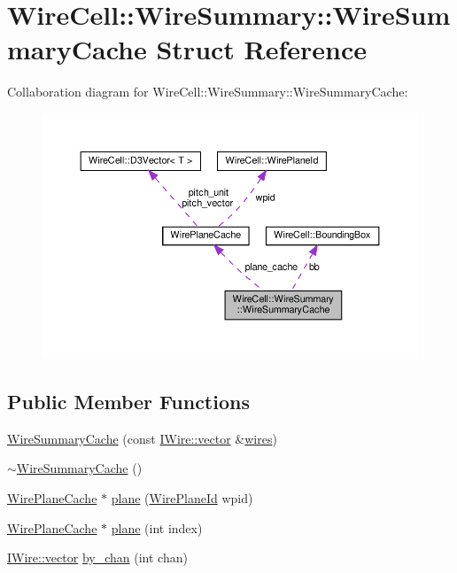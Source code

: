 \hypertarget{struct_wire_summary_1_1_wire_summary_cache}{}\section{Wire\+Cell\+:\+:Wire\+Summary\+:\+:Wire\+Summary\+Cache Struct Reference}
\label{struct_wire_summary_1_1_wire_summary_cache}


Collaboration diagram for Wire\+Cell\+:\+:Wire\+Summary\+:\+:Wire\+Summary\+Cache\+:
\nopagebreak
\begin{figure}[H]
\begin{center}
\leavevmode
\includegraphics[width=350pt]{struct_wire_summary_1_1_wire_summary_cache__coll__graph}
\end{center}
\end{figure}
\subsection*{Public Member Functions}
\begin{DoxyCompactItemize}
\item 
\hyperlink{struct_wire_summary_1_1_wire_summary_cache_abab786675698a6a4add71eabf8f04b49}{Wire\+Summary\+Cache} (const \hyperlink{class_wire_cell_1_1_i_data_ae1a9f863380499bb43f39fabb6276660}{I\+Wire\+::vector} \&\hyperlink{struct_wire_summary_1_1_wire_summary_cache_a986cfc2dce7cd3843932bb49fdf3a976}{wires})
\item 
\hyperlink{struct_wire_summary_1_1_wire_summary_cache_a02d241d53a893a7c1191cdf187f7cecc}{$\sim$\+Wire\+Summary\+Cache} ()
\item 
\hyperlink{struct_wire_plane_cache}{Wire\+Plane\+Cache} $\ast$ \hyperlink{struct_wire_summary_1_1_wire_summary_cache_a07cff10416e77d84eceeb80622e67d2e}{plane} (\hyperlink{class_wire_cell_1_1_wire_plane_id}{Wire\+Plane\+Id} wpid)
\item 
\hyperlink{struct_wire_plane_cache}{Wire\+Plane\+Cache} $\ast$ \hyperlink{struct_wire_summary_1_1_wire_summary_cache_a86147b0ab4bc28d672a3b0d7c969445e}{plane} (int index)
\item 
\hyperlink{class_wire_cell_1_1_i_data_ae1a9f863380499bb43f39fabb6276660}{I\+Wire\+::vector} \hyperlink{struct_wire_summary_1_1_wire_summary_cache_ad784a35d795a1e10f711b9b6c9719ebf}{by\+\_\+chan} (int chan)
\end{DoxyCompactItemize}
